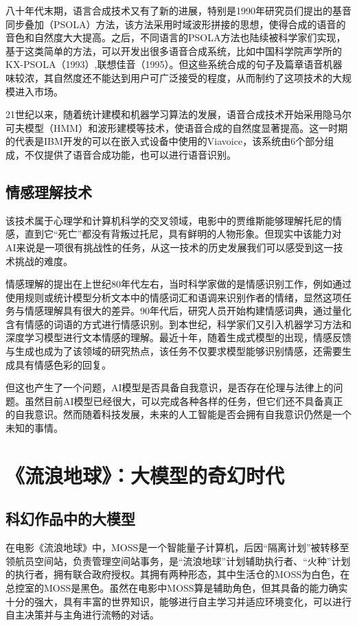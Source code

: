八十年代末期，语言合成技术又有了新的进展，特别是1990年研究员们提出的基音同步叠加（PSOLA）方法，该方法采用时域波形拼接的思想，使得合成的语音的音色和自然度大大提高。之后，不同语言的PSOLA方法也陆续被科学家们实现，基于这类简单的方法，可以开发出很多语音合成系统，比如中国科学院声学所的KX-PSOLA（1993）,联想佳音（1995）。但这些系统合成的句子及篇章语音机器味较浓，其自然度还不能达到用户可广泛接受的程度，从而制约了这项技术的大规模进入市场。

21世纪以来，随着统计建模和机器学习算法的发展，语音合成技术开始采用隐马尔可夫模型（HMM）和波形建模等技术，使语音合成的自然度显著提高。这一时期的代表是IBM开发的可以在嵌入式设备中使用的Viavoice，该系统由6个部分组成，不仅提供了语音合成功能，也可以进行语音识别。

\subsection{情感理解技术}

该技术属于心理学和计算机科学的交叉领域，电影中的贾维斯能够理解托尼的情感，直到它“死亡”都没有背叛过托尼，具有鲜明的人物形象。但现实中该能力对AI来说是一项很有挑战性的任务，从这一技术的历史发展我们可以感受到这一技术挑战的难度。

情感理解的提出在上世纪80年代左右，当时科学家做的是情感识别工作，例如通过使用规则或统计模型分析文本中的情感词汇和语调来识别作者的情绪，显然这项任务与情感理解具有很大的差异。90年代后，研究人员开始构建情感词典，通过量化含有情感的词语的方式进行情感识别。到本世纪，科学家们又引入机器学习方法和深度学习模型进行文本情感的理解。最近十年，随着生成式模型的出现，情感反馈与生成也成为了该领域的研究热点，该任务不仅要求模型能够识别情感，还需要生成具有情感色彩的回复。

但这也产生了一个问题，AI模型是否具备自我意识，是否存在伦理与法律上的问题。虽然目前AI模型已经很大，可以完成各种各样的任务，但它们还不具备真正的自我意识。然而随着科技发展，未来的人工智能是否会拥有自我意识仍然是一个未知的事情。

\section{《流浪地球》：大模型的奇幻时代}
\subsection{科幻作品中的大模型}

在电影《流浪地球》中，MOSS是一个智能量子计算机，后因“隔离计划”被转移至领航员空间站，负责管理空间站事务，是“流浪地球”计划辅助执行者、“火种”计划的执行者，拥有联合政府授权。其拥有两种形态，其中生活仓的MOSS为白色，在总控室的MOSS是黑色。虽然在电影中MOSS算是辅助角色，但其具备的能力确实十分的强大，具有丰富的世界知识，能够进行自主学习并适应环境变化，可以进行自主决策并与主角进行流畅的对话。

